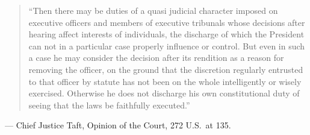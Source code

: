 \documentclass[12pt]{article}
\begin{document}
\begin{quote}
``Then there may be duties of a quasi judicial character imposed on executive officers and members of executive tribunals whose decisions after hearing affect interests of individuals, the discharge of which the President can not in a particular case properly influence or control. But even in such a case he may consider the decision after its rendition as a reason for removing the officer, on the ground that the discretion regularly entrusted to that officer by statute has not been on the whole intelligently or wisely exercised. Otherwise he does not discharge his own constitutional duty of seeing that the laws be faithfully executed.''
\end{quote}
\noindent --- Chief Justice Taft, Opinion of the Court, 272 U.S.\ at 135.
\end{document}
